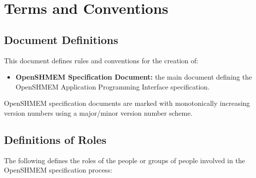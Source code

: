 \chapter{Terms and Conventions}


\section{Document Definitions}

This document defines rules and conventions for the creation of:

\begin{itemize}
\item {\bf OpenSHMEM Specification Document:} the main document defining the
  OpenSHMEM Application Programming Interface specification.
\end{itemize}

OpenSHMEM specification documents are marked with monotonically increasing
version numbers using a major/minor version number scheme.

\section{Definitions of Roles}

The following defines the roles of the people or groups of people
involved in the OpenSHMEM specification process:

